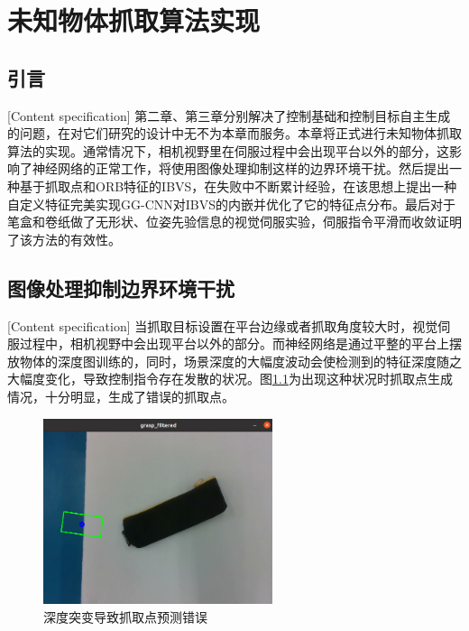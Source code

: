 \documentclass[fontset=fandol,type=bachelor,campus=harbin]{hithesisbook}
\begin{document}
\chapter[未知物体抓取算法实现]{未知物体抓取算法实现}
\section{引言}[Content specification]
第二章、第三章分别解决了控制基础和控制目标自主生成的问题，在对它们研究的设计中无不为本章而服务。本章将正式进行未知物体抓取算法的实现。通常情况下，相机视野里在伺服过程中会出现平台以外的部分，这影响了神经网络的正常工作，将使用图像处理抑制这样的边界环境干扰。然后提出一种基于抓取点和ORB特征的IBVS，在失败中不断累计经验，在该思想上提出一种自定义特征完美实现GG-CNN对IBVS的内嵌并优化了它的特征点分布。最后对于笔盒和卷纸做了无形状、位姿先验信息的视觉伺服实验，伺服指令平滑而收敛证明了该方法的有效性。

\section{图像处理抑制边界环境干扰}[Content specification]
当抓取目标设置在平台边缘或者抓取角度较大时，视觉伺服过程中，相机视野中会出现平台以外的部分。而神经网络是通过平整的平台上摆放物体的深度图训练的，同时，场景深度的大幅度波动会使检测到的特征深度随之大幅度变化，导致控制指令存在发散的状况。图\ref{深度突变导致抓取点预测错误}为出现这种状况时抓取点生成情况，十分明显，生成了错误的抓取点。
\begin{figure}[h]
\centering
\includegraphics[width = 0.6\textwidth]{chapter4/深度突变导致抓取点预测错误}
\caption{深度突变导致抓取点预测错误}
\label{深度突变导致抓取点预测错误}
\end{figure}
\end{document}
